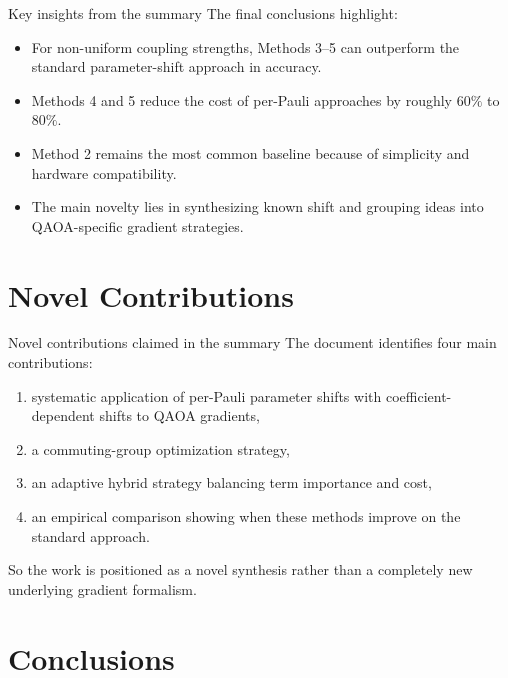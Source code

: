 \documentclass[aspectratio=169]{beamer}
\begin{document}
\begin{frame}{Key insights from the summary}
The final conclusions highlight:

\begin{itemize}
\item For non-uniform coupling strengths, Methods 3--5 can outperform the standard parameter-shift approach in accuracy.
\item Methods 4 and 5 reduce the cost of per-Pauli approaches by roughly \(60\%\) to \(80\%\).
\item Method 2 remains the most common baseline because of simplicity and hardware compatibility.
\item The main novelty lies in synthesizing known shift and grouping ideas into QAOA-specific gradient strategies.
\end{itemize}
\end{frame}

\section{Novel Contributions}

\begin{frame}{Novel contributions claimed in the summary}
The document identifies four main contributions:
\begin{enumerate}
\item systematic application of per-Pauli parameter shifts with coefficient-dependent shifts to QAOA gradients,
\item a commuting-group optimization strategy,
\item an adaptive hybrid strategy balancing term importance and cost,
\item an empirical comparison showing when these methods improve on the standard approach.
\end{enumerate}

So the work is positioned as a novel synthesis rather than a completely new underlying gradient formalism.
\end{frame}

\section{Conclusions}
\end{document}
